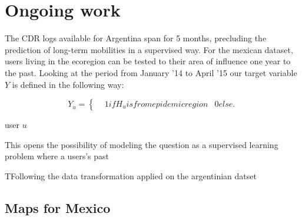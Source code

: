 \section{Ongoing work}

The CDR logs available for Argentina span for 5 months, precluding the prediction of long-term mobilities in a supervised way. For the mexican dataset, users living in the ecoregion can be tested to their area of influence one year to the past. Looking at the period from January '14 to April '15 our target variable $Y $ is defined in the following way: 

\[
    Y_u =
      \begin{cases}
        &1 if H_u is from epidemic region
        &0 else.
      \end{cases}
    \]

user $u$ 

This opens the possibility of modeling the question as a supervised learning problem where a users's past 

TFollowing the data transformation applied on the argentinian datset

\subsection{Maps for Mexico}